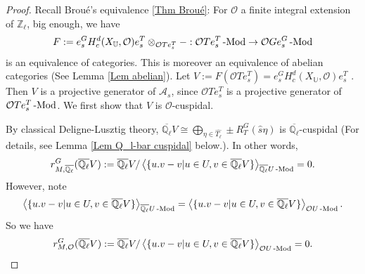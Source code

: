 	\begin{proof}
		
		Recall Broué's equivalence \ref{Thm Broué}: For $\mathcal{O}$ a finite integral extension of $\mathbb{Z}_{\ell}$, big enough, we have
		$$F:=e_s^GH^d_c(X_{\mathbb{U}}, \mathcal{O})e_s^T\otimes_{\mathcal{O}Te_s^T}-: \mathcal{O}Te_s^T\operatorname{-Mod} \to \mathcal{O}Ge_s^G\operatorname{-Mod}$$ is an equivalence of categories. This is moreover an equivalence of abelian categories (See Lemma \ref{Lem abelian}). Let $V:=F(\mathcal{O}Te_s^T)=e_s^GH^d_c(X_{\mathbb{U}}, \mathcal{O})e_s^T$ %
		. Then $V$ is a projective generator of $\mathcal{A}_s$, since $\mathcal{O}Te_s^T$ is a projective generator of $\mathcal{O}Te_s^T\operatorname{-Mod}$. We first show that $V$ is $\mathcal{O}$-cuspidal.
		
		By classical Deligne-Lusztig theory, $\overline{\mathbb{Q}_{\ell}}V \cong \bigoplus_{\eta \in \hat{T_{\ell}}}\pm R_T^G(\hat{s}\eta)$ 
		is $\overline{\mathbb{Q}_{\ell}}$-cuspidal (For details, see Lemma \ref{Lem Q_l-bar cuspidal} below.). 
		In other words, 
		$$r^G_{M, \overline{\mathbb{Q}_{\ell}}}(\overline{\mathbb{Q}_{\ell}}V):=\overline{\mathbb{Q}_{\ell}}V/\left<\{u.v-v | u \in U, v \in \overline{\mathbb{Q}_{\ell}}V\}\right>_{\overline{\mathbb{Q}_{\ell}}U\operatorname{-Mod}}=0.$$
		However, note  
		$$\left<\{u.v-v | u \in U, v \in \overline{\mathbb{Q}_{\ell}}V\}\right>_{\overline{\mathbb{Q}_{\ell}}U\operatorname{-Mod}}=\left<\{u.v-v | u \in U, v \in \overline{\mathbb{Q}_{\ell}}V\}\right>_{\mathcal{O}U\operatorname{-Mod}}.$$
		So we have 
		$$r^G_{M, \mathcal{O}}(\overline{\mathbb{Q}_{\ell}}V):=\overline{\mathbb{Q}_{\ell}}V/\left<\{u.v-v | u \in U, v \in \overline{\mathbb{Q}_{\ell}}V\}\right>_{\mathcal{O}U\operatorname{-Mod}}=0.$$
		

\end{proof}
